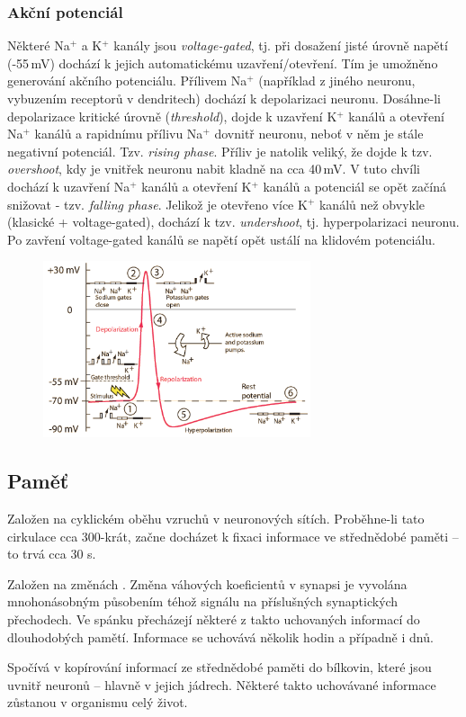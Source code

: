 \documentclass[11pt]{report} %
\begin{document}
\subsubsection{Akční potenciál}
Některé Na$^+$ a K$^+$ kanály jsou \textit{voltage-gated}, tj. při dosažení jisté úrovně napětí (-55\,mV) dochází k jejich automatickému uzavření/otevření. Tím je umožněno generování akčního potenciálu. Přílivem Na$^+$ (například z jiného neuronu, vybuzením receptorů v dendritech) dochází k depolarizaci neuronu. Dosáhne-li depolarizace kritické úrovně (\textit{threshold}), dojde k uzavření K$^+$ kanálů a otevření Na$^+$ kanálů a rapidnímu přílivu Na$^+$ dovnitř neuronu, neboť v něm je stále negativní potenciál. Tzv. \textit{rising phase}. Příliv je natolik veliký, že dojde k tzv. \textit{overshoot}, kdy je vnitřek neuronu nabit kladně na cca 40\,mV. V tuto chvíli dochází k uzavření Na$^+$ kanálů a otevření K$^+$ kanálů a potenciál se opět začíná snižovat - tzv. \textit{falling phase}. Jelikož je otevřeno více K$^+$ kanálů než obvykle (klasické + voltage-gated), dochází k tzv. \textit{undershoot}, tj. hyperpolarizaci neuronu. Po zavření voltage-gated kanálů se napětí opět ustálí na klidovém potenciálu.
\begin{figure}[H]
	\centering
	\includegraphics[width=0.7\textwidth]{img/action_potential.png}
\end{figure}

\subsection{Paměť}
\begin{description}
	\leftskip 40pt
	\setlength{\itemsep}{0pt}
	\item[Krátkodobý paměťový mechanismus] Založen na cyklickém oběhu vzruchů v neuronových sítích. Proběhne-li tato cirkulace cca 300-krát, začne docházet k fixaci informace ve střednědobé paměti – to trvá cca 30 s.
	\item[Střednědobý paměťový mechanismus] Založen na změnách . Změna váhových koeficientů v synapsi je vyvolána mnohonásobným působením téhož signálu na příslušných synaptických přechodech. Ve spánku přecházejí některé z takto uchovaných informací do dlouhodobých pamětí. Informace se uchovává několik hodin a případně i dnů.
	\item[Dlouhodobý paměťový mechanismus] Spočívá v kopírování informací ze střednědobé paměti do bílkovin, které jsou uvnitř neuronů – hlavně v jejich jádrech. Některé takto uchovávané informace zůstanou v organismu celý život.
\end{description}
\end{document}
